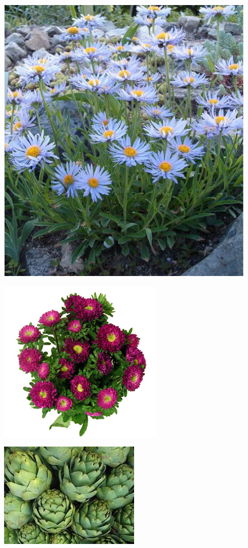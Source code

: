 \documentclass{article}
\begin{document}
\begin{center}
\includegraphics[width=0.9\textheight, angle=90]{../Aster_alpinus.jpg}
\end{center}
\newpage

\begin{center}
\includegraphics[width=0.9\textheight, angle=90]{../Aster_Bouquet.jpg}
\end{center}
\newpage

\begin{center}
\includegraphics[width=0.9\textheight, angle=90]{../Atrichoke.jpg}
\end{center}
\newpage
\end{document}
